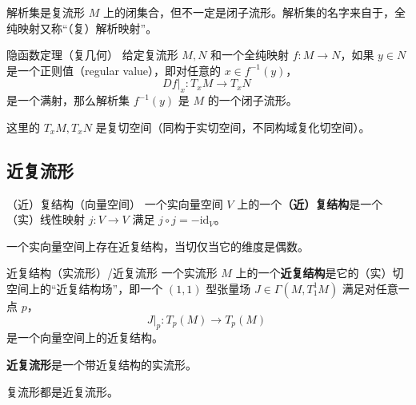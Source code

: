 解析集是复流形 $M$ 上的闭集合，但不一定是闭子流形。解析集的名字来自于，全纯映射又称“（复）解析映射”。

\begin{theorem}{隐函数定理（复几何）}
给定复流形 $M, N$ 和一个全纯映射 $f: M \to N$，如果 $y \in N$ 是一个正则值（regular value），即对任意的 $x \in f^{-1}(y)$，
$$
D f|_x: T_x M \to T_x N~
$$
是一个满射，那么解析集 $f^{-1}(y)$ 是 $M$ 的一个闭子流形。
\end{theorem}
这里的 $T_x M, T_x N$ 是复切空间（同构于实切空间，不同构域复化切空间）。


\subsection{近复流形}

\begin{definition}{（近）复结构（向量空间）}
一个实向量空间 $V$ 上的一个\textbf{（近）复结构}是一个（实）线性映射 $j: V \to V$ 满足 $j \circ j = - \text{id}_V$。
\end{definition}

\begin{theorem}{}
一个实向量空间上存在近复结构，当切仅当它的维度是偶数。
\end{theorem}

\begin{definition}{近复结构（实流形）/近复流形}
一个实流形 $M$ 上的一个\textbf{近复结构}是它的（实）切空间上的“近复结构场”，即一个 $(1, 1)$ 型张量场 $J \in \Gamma(M, T_1^1 M)$ 满足对任意一点 $p$， 
$$
J|_p: T_p(M) \to T_p(M)~
$$
是一个向量空间上的近复结构。

\textbf{近复流形}是一个带近复结构的实流形。
\end{definition}

\begin{theorem}{}
复流形都是近复流形。
\end{theorem}





